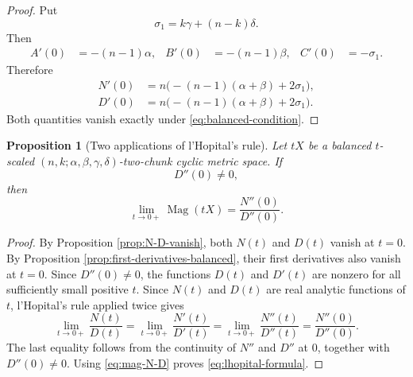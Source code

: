 \documentclass[11pt]{amsart}
\numberwithin{equation}{section}
\newtheorem{proposition}[theorem]{Proposition}
\theoremstyle{definition}
\theoremstyle{remark}
\DeclareMathOperator{\Mag}{Mag}
\begin{document}
\begin{proof}
Put
\begin{equation}\label{eq:sigma-one}
\sigma_1=k\gamma+(n-k)\delta.
\end{equation}
Then
\begin{align}
A'(0)&=-(n-1)\alpha,
&
B'(0)&=-(n-1)\beta,
&
C'(0)&=-\sigma_1.
\label{eq:first-derivatives-A-B-C}
\end{align}
Therefore
\begin{align}
N'(0)&=n\bigl(-(n-1)(\alpha+\beta)+2\sigma_1\bigr),
\label{eq:N-prime-computation}\\
D'(0)&=n\bigl(-(n-1)(\alpha+\beta)+2\sigma_1\bigr).
\label{eq:D-prime-computation}
\end{align}
Both quantities vanish exactly under \eqref{eq:balanced-condition}.
\end{proof}

\begin{proposition}[Two applications of l'Hopital's rule]\label{prop:lhopital}
Let \(tX\) be a balanced \(t\)-scaled \((n,k;\alpha,\beta,\gamma,\delta)\)-two-chunk cyclic metric space.  If
\begin{equation}\label{eq:D-second-nonzero}
D''(0)\neq 0,
\end{equation}
then
\begin{equation}\label{eq:lhopital-formula}
\lim_{t\to 0+}\Mag(tX)=
\frac{N''(0)}{D''(0)}.
\end{equation}
\end{proposition}

\begin{proof}
By Proposition \ref{prop:N-D-vanish}, both \(N(t)\) and \(D(t)\) vanish at \(t=0\).  By Proposition \ref{prop:first-derivatives-balanced}, their first derivatives also vanish at \(t=0\).  Since \(D''(0)\neq 0\), the functions \(D(t)\) and \(D'(t)\) are nonzero for all sufficiently small positive \(t\).  Since \(N(t)\) and \(D(t)\) are real analytic functions of \(t\), l'Hopital's rule applied twice gives
\begin{equation}\label{eq:lhopital-proof}
\lim_{t\to 0+}\frac{N(t)}{D(t)}
=
\lim_{t\to 0+}\frac{N'(t)}{D'(t)}
=
\lim_{t\to 0+}\frac{N''(t)}{D''(t)}
=
\frac{N''(0)}{D''(0)}.
\end{equation}
The last equality follows from the continuity of \(N''\) and \(D''\) at
\(0\), together with \(D''(0)\neq0\).  Using \eqref{eq:mag-N-D} proves
\eqref{eq:lhopital-formula}.
\end{proof}
\end{document}
